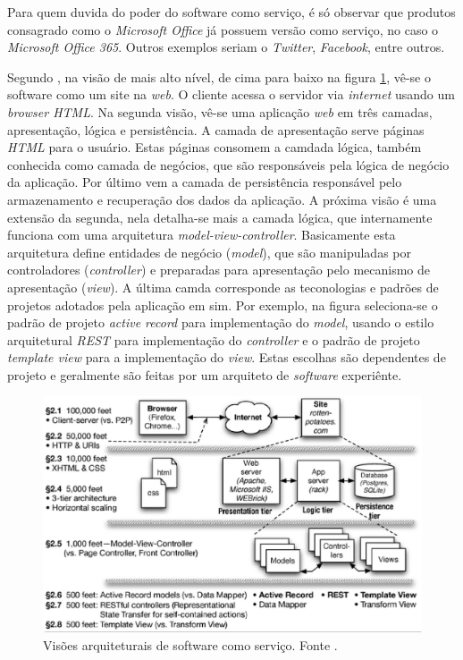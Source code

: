 	Para quem duvida do poder do software como serviço, é só observar que produtos consagrado como o \emph{Microsoft Office} já possuem versão como serviço, no caso o \emph{Microsoft Office 365}. Outros exemplos seriam o \emph{Twitter}, \emph{Facebook}, entre outros.
	

Segundo , na visão de mais alto nível, de cima para baixo na figura \ref{saas_view}, vê-se o software como um site na \emph{web}. 
O cliente acessa o servidor via \emph{internet} usando um \emph{browser HTML}. 
Na segunda visão, vê-se uma aplicação \emph{web} em três camadas, apresentação, lógica e persistência.
A camada de apresentação serve páginas \emph{HTML} para o usuário. Estas páginas consomem a camdada lógica, também conhecida como camada de negócios, que são responsáveis pela lógica de negócio da aplicação. Por último vem a camada de persistência responsável pelo armazenamento e recuperação dos dados da aplicação.
A próxima visão é uma extensão da segunda, nela detalha-se mais a camada lógica, que internamente funciona com uma arquitetura \emph{model-view-controller}. 
Basicamente esta arquitetura define entidades de negócio (\emph{model}), que são manipuladas por controladores (\emph{controller}) e preparadas para apresentação pelo mecanismo de apresentação (\emph{view}).
A última camda corresponde as teconologias e padrões de projetos adotados pela aplicação em sim. Por exemplo, na figura seleciona-se o padrão de projeto \emph{active record} para implementação do \emph{model},  usando o estilo arquitetural \emph{REST} para implementação do \emph{controller} e o padrão de projeto \emph{template view} para a implementação do \emph{view}. Estas escolhas são dependentes de projeto e geralmente são feitas por um arquiteto de \emph{software} experiênte. 

\begin{figure}[ht]
	\centering
	\includegraphics[width=15 cm]{figuras/saas_view.eps}
	\caption{Visões arquiteturais de software como serviço. Fonte \cite{Fox2012}.}
    	\label{saas_view}
\end{figure}


